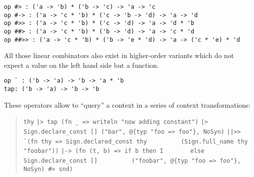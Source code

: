 \begin{isabellebody}
\begin{isamarkuptext}
\begin{quotation}
  \end{quotation}%
\end{isamarkuptext}%
\isamarkuptrue%
%
\isadelimmlref
%
\endisadelimmlref
%
\isatagmlref
%
\begin{isamarkuptext}%
\begin{mldecls}
  \verb|op #> : ('a -> 'b) * ('b -> 'c) -> 'a -> 'c| \\
  \verb|op #-> : ('a -> 'c * 'b) * ('c -> 'b -> 'd) -> 'a -> 'd| \\
  \verb|op #>> : ('a -> 'c * 'b) * ('c -> 'd) -> 'a -> 'd * 'b| \\
  \verb|op ##> : ('a -> 'c * 'b) * ('b -> 'd) -> 'a -> 'c * 'd| \\
  \verb|op ##>> : ('a -> 'c * 'b) * ('b -> 'e * 'd) -> 'a -> ('c * 'e) * 'd| \\
  \end{mldecls}%
\end{isamarkuptext}%
\isamarkuptrue%
%
\endisatagmlref
{\isafoldmlref}%
%
\isadelimmlref
%
\endisadelimmlref
%
\begin{isamarkuptext}%
\noindent All those linear combinators also exist in higher-order
  variants which do not expect a value on the left hand side
  but a function.%
\end{isamarkuptext}%
\isamarkuptrue%
%
\isadelimmlref
%
\endisadelimmlref
%
\isatagmlref
%
\begin{isamarkuptext}%
\begin{mldecls}
  \verb|op ` : ('b -> 'a) -> 'b -> 'a * 'b| \\
  \verb|tap: ('b -> 'a) -> 'b -> 'b| \\
  \end{mldecls}%
\end{isamarkuptext}%
\isamarkuptrue%
%
\endisatagmlref
{\isafoldmlref}%
%
\isadelimmlref
%
\endisadelimmlref
%
\begin{isamarkuptext}%
\noindent These operators allow to ``query'' a context
  in a series of context transformations:

  \begin{quotation}
\verb|thy|\isasep\isanewline%
\verb||\verb,|,\verb|> tap (fn _ => writeln "now adding constant")|\isasep\isanewline%
\verb||\verb,|,\verb|> Sign.declare_const [] ("bar", @{typ "foo => foo"}, NoSyn)|\isasep\isanewline%
\verb||\verb,|,\verb||\verb,|,\verb|>> `(fn thy => Sign.declared_const thy|\isasep\isanewline%
\verb|         (Sign.full_name thy "foobar"))|\isasep\isanewline%
\verb||\verb,|,\verb|-> (fn (t, b) => if b then I|\isasep\isanewline%
\verb|       else Sign.declare_const []|\isasep\isanewline%
\verb|         ("foobar", @{typ "foo => foo"}, NoSyn) #> snd)|\isasep\isanewline%


\end{quotation}
\end{isamarkuptext}
\end{isabellebody}
